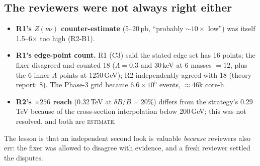 \documentclass[11pt,a4paper]{article}
\newcommand{\EST}{\textsc{estimate}}
\begin{document}
\subsection{The reviewers were not always right either}
\begin{itemize}
\item \textbf{R1's $Z(\nu\nu)$ counter-estimate} (5--20\,pb, ``probably $\sim10\times$ low'') was itself 1.5--6$\times$ too high (R2-B1).
\item \textbf{R1's edge-point count.} R1 (C3) said the stated edge set has 16 points; the fixer disagreed and counted 18 ($\Lambda=0.3$ and 30\,keV at 6 masses $=12$, plus the 6 inner-$\Lambda$ points at 1250\,GeV); R2 independently agreed with 18 (theory report: 8). The Phase-3 grid became $6.6\times10^5$ events, $\approx$46k core-h.
\item \textbf{R2's $\times256$ reach} (0.32\,TeV at $\delta B/B=20\%$) differs from the strategy's 0.29\,TeV because of the cross-section interpolation below 200\,GeV; this was not resolved, and both are \EST.
\end{itemize}
The lesson is that an independent second look is valuable \emph{because} reviewers also err: the fixer was allowed to disagree with evidence, and a fresh reviewer settled the disputes.
\end{document}
